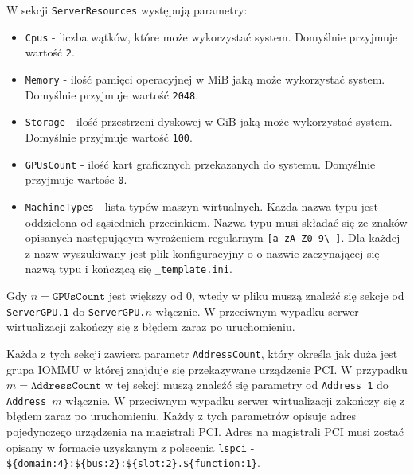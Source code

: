 \documentclass[../opis-rozwiazania.tex]{subfiles}
\begin{document}
W sekcji \texttt{ServerResources} występują parametry:
\begin{itemize}
  \item \texttt{Cpus} - liczba wątków, które może wykorzystać system. Domyślnie przyjmuje wartość \texttt{2}.
  \item \texttt{Memory} - ilość pamięci operacyjnej w MiB jaką może wykorzystać system. Domyślnie przyjmuje wartość \texttt{2048}.
  \item \texttt{Storage} - ilość przestrzeni dyskowej w GiB jaką może wykorzystać system. Domyślnie przyjmuje wartość \texttt{100}.
  \item \texttt{GPUsCount} - ilość kart graficznych przekazanych do systemu. Domyślnie przyjmuje wartośc \texttt{0}.
  \item \texttt{MachineTypes} - lista typów maszyn wirtualnych. Każda nazwa typu jest oddzielona od sąsiednich przecinkiem. Nazwa typu musi składać się ze znaków opisanych następującym wyrażeniem regularnym \texttt{[a-zA-Z0-9\textbackslash-]}. Dla każdej z nazw wyszukiwany jest plik konfiguracyjny o o nazwie zaczynającej się nazwą typu i kończącą się \texttt{\_template.ini}.
\end{itemize}

Gdy $n = \texttt{GPUsCount}$ jest większy od 0, wtedy w pliku muszą znaleźć się sekcje od \texttt{ServerGPU.1} do \texttt{ServerGPU.$n$} włącznie.
W przeciwnym wypadku serwer wirtualizacji zakończy się z błędem zaraz po uruchomieniu.

Każda z tych sekcji zawiera parametr \texttt{AddressCount}, który określa jak duża jest grupa IOMMU w której znajduje się przekazywane urządzenie PCI.
W przypadku $m = \texttt{AddressCount}$ w tej sekcji muszą znaleźć się parametry od \texttt{Address\_1} do \texttt{Address\_$m$} włącznie.
W przeciwnym wypadku serwer wirtualizacji zakończy się z błędem zaraz po uruchomieniu.
Każdy z tych parametrów opisuje adres pojedynczego urządzenia na magistrali PCI.
Adres na magistrali PCI musi zostać opisany w formacie uzyskanym z polecenia \texttt{lspci} - \texttt{\$\{domain:4\}:\$\{bus:2\}:\$\{slot:2\}.\$\{function:1\}}.
\end{document}
